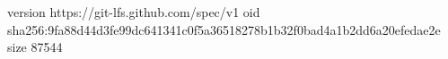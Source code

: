 version https://git-lfs.github.com/spec/v1
oid sha256:9fa88d44d3fe99dc641341c0f5a36518278b1b32f0bad4a1b2dd6a20efedae2e
size 87544
